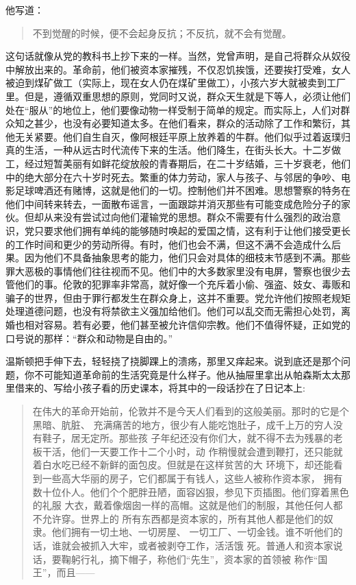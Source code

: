 他写道：

\begin{quotation}
不到觉醒的时候，便不会起身反抗；不反抗，就不会有觉醒。
\end{quotation}

这句话就像从党的教科书上抄下来的一样。当然，党曾声明，是自己将群众从奴役中解放出来的。革命前，他们被资本家摧残，不仅忍饥挨饿，还要挨打受难，女人被迫到煤矿做工（实际上，现在女人仍在煤矿里做工），小孩六岁大就被卖到工厂里。但是，遵循双重思想的原则，党同时又说，群众天生就是下等人，必须让他们处在``服从''的地位上，他们要像动物一样受制于简单的规定。而实际上，人们对群众知之甚少，也没有必要知道太多。在他们看来，群众的活动除了工作和繁衍，其他无关紧要。他们自生自灭，像阿根廷平原上放养着的牛群。他们似乎过着返璞归真的生活，一种从远古时代流传下来的生活。他们降生，在街头长大。十二岁做工，经过短暂美丽有如鲜花绽放般的青春期后，在二十岁结婚，三十岁衰老，他们中的绝大部分在六十岁时死去。繁重的体力劳动，家人与孩子、与邻居的争吵、电影足球啤酒还有赌博，这就是他们的一切。控制他们并不困难。思想警察的特务在他们中间转来转去，一面散布谣言，一面跟踪并消灭那些有可能变成危险分子的家伙。但却从来没有尝试过向他们灌输党的思想。群众不需要有什么强烈的政治意识，党只要求他们拥有单纯的能够随时唤起的爱国之情，这有利于让他们接受更长的工作时间和更少的劳动所得。有时，他们也会不满，但这不满不会造成什么后果。因为他们不具备抽象思考的能力，他们只会对具体的细枝末节感到不满。那些罪大恶极的事情他们往往视而不见。他们中的大多数家里没有电屏，警察也很少去管他们的事。伦敦的犯罪率非常高，就好像一个充斥着小偷、强盗、妓女、毒贩和骗子的世界，但由于罪行都发生在群众身上，这并不重要。党允许他们按照老规矩处理道德问题，也没有将禁欲主义强加给他们。他们可以乱交而无需担心处罚，离婚也相对容易。若有必要，他们甚至被允许信仰宗教。他们不值得怀疑，正如党的口号说的那样：``群众和动物是自由的。''

温斯顿把手伸下去，轻轻挠了挠脚踝上的溃疡，那里又痒起来。说到底还是那个问题，你不可能知道革命前的生活究竟是什么样子。他从抽屉里拿出从帕森斯太太那里借来的、写给小孩子看的历史课本，将其中的一段话抄在了日记本上:

\begin{quotation}
在伟大的革命开始前，伦敦并不是今天人们看到的这般美丽。那时的它是个黑暗、肮脏、
充满痛苦的地方，很少有人能吃饱肚子，成千上万的穷人没有鞋子，居无定所。那些孩
子年纪还没有你们大，就不得不去为残暴的老板干活，他们一天要工作十二个小时，动
作稍慢就会遭到鞭打，还只能就着白水吃已经不新鲜的面包皮。但就是在这样贫苦的大
环境下，却还能看到一些高大华丽的房子，它们都属于有钱人，这些人被称作资本家，
拥有数十位仆人。他们个个肥胖丑陋，面容凶狠，参见下页插图。他们穿着黑色的礼服
大衣，戴着像烟囱一样的高帽。这就是他们的制服，其他任何人都不允许穿。世界上的
所有东西都是资本家的，所有其他人都是他们的奴隶。他们拥有一切土地、一切房屋、
一切工厂、一切金钱。谁不听他们的话，谁就会被抓入大牢，或者被剥夺工作，活活饿
死。普通人和资本家说话，要鞠躬行礼，摘下帽子，称他们``先生''，资本家的首领被
称作``国王''，而且——
\end{quotation}



